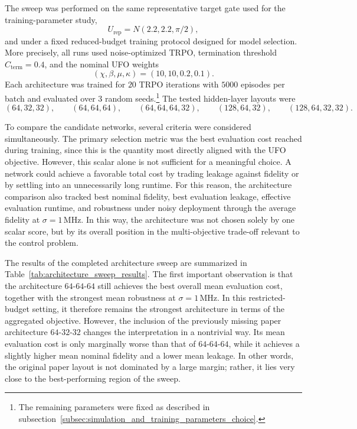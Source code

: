 The sweep was performed on the same representative target gate used for the training-parameter study,
\begin{equation}
U_{\mathrm{rep}} = N(2.2,2.2,\pi/2),
\label{eq:nn_sweep_representative_target}
\end{equation}
and under a fixed reduced-budget training protocol designed for model selection.
More precisely, all runs used noise-optimized TRPO, termination threshold \(C_{\mathrm{term}}=0.4\), and the nominal UFO weights
\begin{equation}
(\chi,\beta,\mu,\kappa)=(10,10,0.2,0.1).
\label{eq:nn_sweep_default_weights}
\end{equation}
Each architecture was trained for \(20\) TRPO iterations with \(5000\) episodes per batch and evaluated over \(3\) random seeds.\footnote{The remaining parameters were fixed as described in subsection~\ref{subsec:simulation_and_training_parameters_choice}.}
The tested hidden-layer layouts were
\begin{equation}
(64,32,32),\qquad
(64,64,64),\qquad
(64,64,64,32),\qquad
(128,64,32),\qquad
(128,64,32,32).
\label{eq:tested_hidden_sizes}
\end{equation}

To compare the candidate networks, several criteria were considered simultaneously. The primary selection metric was the best evaluation cost reached during training, since this is the quantity most directly aligned with the UFO objective. However, this scalar alone is not sufficient for a meaningful choice. A network could achieve a favorable total cost by trading leakage against fidelity or by settling into an unnecessarily long runtime. For this reason, the architecture comparison also tracked best nominal fidelity, best evaluation leakage, effective evaluation runtime, and robustness under noisy deployment through the average fidelity at \(\sigma=1\,\mathrm{MHz}\). In this way, the architecture was not chosen solely by one scalar score, but by its overall position in the multi-objective trade-off relevant to the control problem.

The results of the completed architecture sweep are summarized in Table~\ref{tab:architecture_sweep_results}. The first important observation is that the architecture \(64\text{-}64\text{-}64\) still achieves the best overall mean evaluation cost, together with the strongest mean robustness at \(\sigma=1\,\mathrm{MHz}\). In this restricted-budget setting, it therefore remains the strongest architecture in terms of the aggregated objective. However, the inclusion of the previously missing paper architecture \(64\text{-}32\text{-}32\) changes the interpretation in a nontrivial way. Its mean evaluation cost is only marginally worse than that of \(64\text{-}64\text{-}64\), while it achieves a slightly higher mean nominal fidelity and a lower mean leakage. In other words, the original paper layout is not dominated by a large margin; rather, it lies very close to the best-performing region of the sweep.

